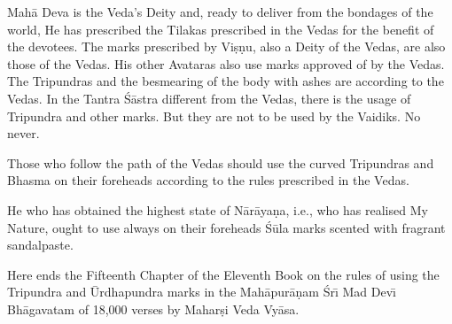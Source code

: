 Mah\=a Deva is the Veda's Deity and, ready to deliver from the bondages of the world, He has prescribed the Tilakas prescribed in the Vedas for the benefit of the devotees. The marks prescribed by Vi\d{s}\d{n}u, also a Deity of the Vedas, are also those of the Vedas. His other Avataras also use marks approved of by the Vedas. The Tripundras and the besmearing of the body with ashes are according to the Vedas. In the Tantra \'S\=astra different from the Vedas, there is the usage of Tripundra and other marks. But they are not to be used by the Vaidiks. No never.

Those who follow the path of the Vedas should use the curved Tripundras and Bhasma on their foreheads according to the rules prescribed in the Vedas.

He who has obtained the highest state of N\=ar\=aya\d{n}a, i.e., who has realised My Nature, ought to use always on their foreheads \'S\=ula marks scented with fragrant sandalpaste.

Here ends the Fifteenth Chapter of the Eleventh Book on the rules of using the Tripundra and \=Urdhapundra marks in the Mah\=apur\=a\d{n}am \'Sr\={\i} Mad Dev\={\i} Bh\=agavatam of 18,000 verses by Mahar\d{s}i Veda Vy\=asa.



